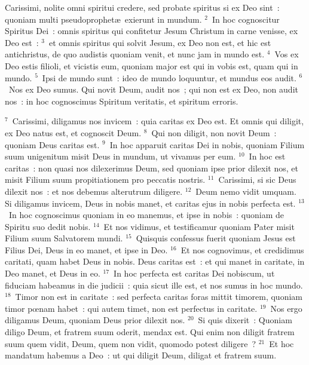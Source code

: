 \lettrine[lines=10,image=true,loversize=0.05,lraise=-0.03]{C}{}arissimi, nolite omni spiritui credere, sed probate spiritus si ex Deo sint~: quoniam multi pseudoprophet\ae\ exierunt in mundum.
${}^{2}$~In hoc cognoscitur Spiritus Dei~: omnis spiritus qui confitetur Jesum Christum in carne venisse, ex Deo est~:
${}^{3}$~et omnis spiritus qui solvit Jesum, ex Deo non est, et hic est antichristus, de quo audistis quoniam venit, et nunc jam in mundo est.
${}^{4}$~Vos ex Deo estis filioli, et vicistis eum, quoniam major est qui in vobis est, quam qui in mundo.
${}^{5}$~Ipsi de mundo sunt~: ideo de mundo loquuntur, et mundus eos audit.
${}^{6}$~Nos ex Deo sumus. Qui novit Deum, audit nos~; qui non est ex Deo, non audit nos~: in hoc cognoscimus Spiritum veritatis, et spiritum erroris.


${}^{7}$~Carissimi, diligamus nos invicem~: quia caritas ex Deo est. Et omnis qui diligit, ex Deo natus est, et cognoscit Deum.
${}^{8}$~Qui non diligit, non novit Deum~: quoniam Deus caritas est.
${}^{9}$~In hoc apparuit caritas Dei in nobis, quoniam Filium suum unigenitum misit Deus in mundum, ut vivamus per eum.
${}^{10}$~In hoc est caritas~: non quasi nos dilexerimus Deum, sed quoniam ipse prior dilexit nos, et misit Filium suum propitiationem pro peccatis nostris.
${}^{11}$~Carissimi, si sic Deus dilexit nos~: et nos debemus alterutrum diligere.
${}^{12}$~Deum nemo vidit umquam. Si diligamus invicem, Deus in nobis manet, et caritas ejus in nobis perfecta est.
${}^{13}$~In hoc cognoscimus quoniam in eo manemus, et ipse in nobis~: quoniam de Spiritu suo dedit nobis.
${}^{14}$~Et nos vidimus, et testificamur quoniam Pater misit Filium suum Salvatorem mundi.
${}^{15}$~Quisquis confessus fuerit quoniam Jesus est Filius Dei, Deus in eo manet, et ipse in Deo.
${}^{16}$~Et nos cognovimus, et credidimus caritati, quam habet Deus in nobis. Deus caritas est~: et qui manet in caritate, in Deo manet, et Deus in eo.
${}^{17}$~In hoc perfecta est caritas Dei nobiscum, ut fiduciam habeamus in die judicii~: quia sicut ille est, et nos sumus in hoc mundo.
${}^{18}$~Timor non est in caritate~: sed perfecta caritas foras mittit timorem, quoniam timor pœnam habet~: qui autem timet, non est perfectus in caritate.
${}^{19}$~Nos ergo diligamus Deum, quoniam Deus prior dilexit nos.
${}^{20}$~Si quis dixerit~: Quoniam diligo Deum, et fratrem suum oderit, mendax est. Qui enim non diligit fratrem suum quem vidit, Deum, quem non vidit, quomodo potest diligere~?
${}^{21}$~Et hoc mandatum habemus a Deo~: ut qui diligit Deum, diligat et fratrem suum.

